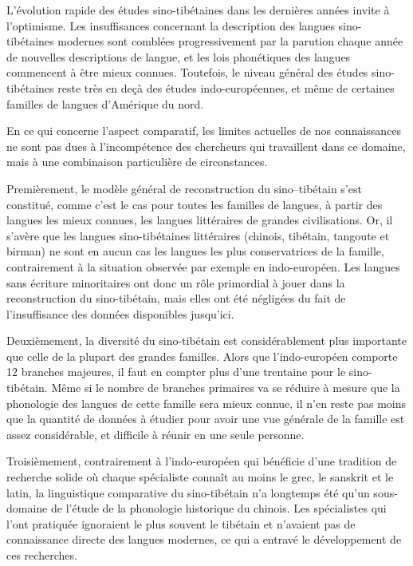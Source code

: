 \documentclass[oldfontcommands,oneside,a4paper,11pt]{memoir}
\begin{document}
L'évolution rapide des études sino-tibétaines dans les dernières années invite à l'optimisme. Les insuffisances concernant la description des langues sino-tibétaines modernes sont comblées progressivement par la parution chaque année de nouvelles descriptions de langue, et les lois phonétiques des langues commencent à être mieux connues. Toutefois, le niveau général des études sino-tibétaines reste très en deçà des études indo-européennes, et même de certaines familles de langues d'Amérique du nord.

En ce qui concerne l'aspect comparatif, les limites actuelles de nos connaissances ne sont pas dues à l'incompétence des chercheurs qui travaillent dans ce domaine, mais à une combinaison particulière de circonstances. 

Premièrement, le modèle général de reconstruction du sino--tibétain s'est constitué, comme c'est le cas pour toutes les familles de langues, à partir des langues les mieux connues, les langues littéraires de grandes civilisations. Or, il s'avère  que les langues sino-tibétaines littéraires (chinois, tibétain, tangoute et birman) ne sont en aucun cas les langues les plus conservatrices de la famille, contrairement à la situation observée par exemple en indo-européen. Les langues sans écriture  minoritaires ont donc un rôle primordial à jouer dans la reconstruction du sino-tibétain, mais elles ont été négligées du fait de l'insuffisance des données disponibles jusqu'ici.

Deuxièmement, la diversité du sino-tibétain est considérablement plus importante que celle de la plupart des grandes familles. Alors que l'indo-européen comporte 12 branches majeures, il faut en compter plus d'une trentaine pour le sino-tibétain. Même si le nombre de branches primaires va se réduire à mesure que la phonologie des langues de cette famille sera mieux connue, il n'en reste pas moins que la quantité de données à étudier pour avoir une vue générale de la famille est assez considérable, et difficile à réunir en une seule personne.

Troisièmement, contrairement à l'indo-européen qui bénéficie d'une tradition de recherche solide où chaque spécialiste connaît au moins le grec, le sanskrit et le latin, la linguistique comparative du sino-tibétain n'a longtemps été qu'un sous-domaine de l'étude de la phonologie historique du chinois. Les spécialistes qui l'ont pratiquée ignoraient le plus souvent le tibétain et n'avaient pas de connaissance directe des langues modernes, ce qui a entravé le développement de ces recherches.
\end{document}
